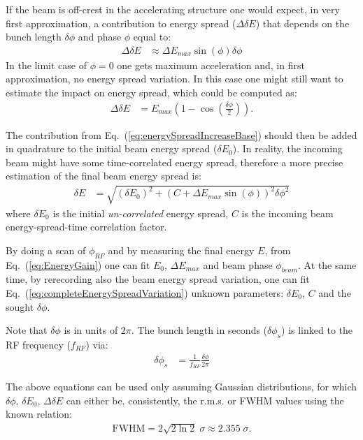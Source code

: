 If the beam is off-crest in the accelerating structure one would expect, in very first approximation, 
a contribution to energy spread ($\Delta \delta E$) that depends on the bunch length $\delta \phi$ and 
phase $\phi$ equal to:
%
\begin{align}
\Delta \delta E &\approx \Delta E_{max} \sin(\phi) \delta \phi
\label{eq:energySpreadIncreaseBase}
\end{align}
%
In the limit case of $\phi = 0$ one gets maximum acceleration and, in first approximation, 
no energy spread variation.
In this case one might still want to estimate the impact on energy spread, 
which could be computed as:
%
\begin{align}
\Delta \delta E &= E_{max} \left(1-\cos\left(\frac{\delta \phi}{2}\right)\right).
\label{eq:energySpreadIncreaseOnCrest}
\end{align} 


%
The contribution from Eq.~(\ref{eq:energySpreadIncreaseBase}) should then be added in quadrature 
to the initial beam energy spread ($\delta E_0$).
%
In reality, the incoming beam might have some time-correlated energy spread, 
therefore a more precise estimation of the final beam energy spread is:
%
\begin{align}
\delta E &= \sqrt{
(\delta E_0)^2 + 
\left(
C
+
\Delta E_{max} \sin(\phi)
\right)^2  \delta\phi ^2
}
\label{eq:completeEnergySpreadVariation}
\end{align}
%
where $\delta E_0$ is the initial \emph{un-correlated} energy spread, 
$C$ is the incoming beam energy-spread-time correlation factor.

%
By doing a scan of $\phi_{RF}$ and by measuring the final energy $E$, 
from Eq.~(\ref{eq:EnergyGain}) one can fit $E_0$,  $\Delta E_{max}$ and beam phase $\phi_{beam}$.
%
At the same time, by rerecording also the beam energy spread variation, 
one can fit Eq.~(\ref{eq:completeEnergySpreadVariation}) unknown parameters: 
$\delta E_0$, $C$ and the sought $\delta\phi$.

Note that $\delta\phi$ is in units of $2 \pi$. The bunch length in seconds ($\delta\phi_{s}$) is 
linked to the RF frequency ($f_{RF}$) via:
%
\begin{align}
\delta\phi_{s} &= \frac{1}{f_{RF}} \frac{\delta\phi}{2 \pi}
\label{eq:conversionRadToS}
\end{align}
%

The above equations can be used only assuming Gaussian distributions, 
for which $\delta\phi$, $\delta E_0$, $\Delta \delta E$ can either be, consistently, 
the r.m.s. or FWHM values using the known relation:
\begin{align}
{\mathrm  {FWHM}}=2{\sqrt  {2\ln 2}}\;\sigma \approx 2.355\;\sigma.
\end{align}



